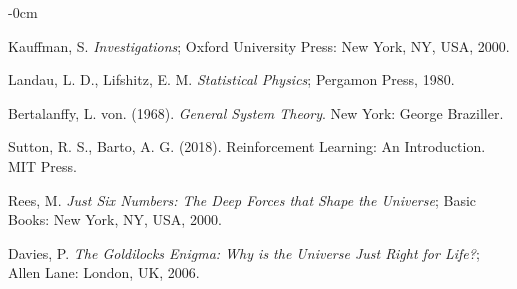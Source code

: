 \documentclass[entropy,article,submit,pdftex,moreauthors]{Definitions/mdpi}
\begin{document}
\begin{adjustwidth}{-\extralength}{0cm}
\begin{thebibliography}{999}
Kauffman, S. \textit{Investigations}; Oxford University Press: New York, NY, USA, 2000.

Landau, L. D., Lifshitz, E. M. \textit{Statistical Physics}; Pergamon Press, 1980.

Bertalanffy, L. von. (1968). \textit{General System Theory}. New York: George Braziller.

Sutton, R. S., Barto, A. G. (2018). Reinforcement Learning: An Introduction. MIT Press.

Rees, M. \textit{Just Six Numbers: The Deep Forces that Shape the Universe}; Basic Books: New York, NY, USA, 2000.

Davies, P. \textit{The Goldilocks Enigma: Why is the Universe Just Right for Life?}; Allen Lane: London, UK, 2006.


\end{thebibliography}

%


\PublishersNote{}
\end{adjustwidth}
\end{document}
